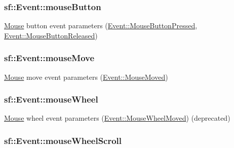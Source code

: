 \hypertarget{classsf_1_1_event_a20886a16ab7624de070b97145bb1dcac}{
\subsubsection[{mouse\-Button}]{ sf\-::\-Event\-::mouse\-Button}}\label{classsf_1_1_event_a20886a16ab7624de070b97145bb1dcac}


\hyperlink{classsf_1_1_mouse}{Mouse} button event parameters (\hyperlink{classsf_1_1_event_af41fa9ed45c02449030699f671331d4aa0d16fdcf7907ec64a9cfabac6e135d1b}{Event\-::\-Mouse\-Button\-Pressed}, \hyperlink{classsf_1_1_event_af41fa9ed45c02449030699f671331d4aafa0ebea6e6dd90e3fe49ca9b52977836}{Event\-::\-Mouse\-Button\-Released}) 

\hypertarget{classsf_1_1_event_a786620ec4315d40c7c4cf4ddf3a1881f}{
\subsubsection[{mouse\-Move}]{ sf\-::\-Event\-::mouse\-Move}}\label{classsf_1_1_event_a786620ec4315d40c7c4cf4ddf3a1881f}


\hyperlink{classsf_1_1_mouse}{Mouse} move event parameters (\hyperlink{classsf_1_1_event_af41fa9ed45c02449030699f671331d4aacc43824f451738c5afd00c7cd08e25b5}{Event\-::\-Mouse\-Moved}) 

\hypertarget{classsf_1_1_event_a8758c6d7998757978fd9146099a02a1e}{
\subsubsection[{mouse\-Wheel}]{ sf\-::\-Event\-::mouse\-Wheel}}\label{classsf_1_1_event_a8758c6d7998757978fd9146099a02a1e}


\hyperlink{classsf_1_1_mouse}{Mouse} wheel event parameters (\hyperlink{classsf_1_1_event_af41fa9ed45c02449030699f671331d4aad53fec9b30096b56d96ae0cc3680c717}{Event\-::\-Mouse\-Wheel\-Moved}) (deprecated) 

\hypertarget{classsf_1_1_event_a5fd91c82198a31a0cd3dc93c4d1ae4c6}{
\subsubsection[{mouse\-Wheel\-Scroll}]{ sf\-::\-Event\-::mouse\-Wheel\-Scroll}}\label{classsf_1_1_event_a5fd91c82198a31a0cd3dc93c4d1ae4c6}


